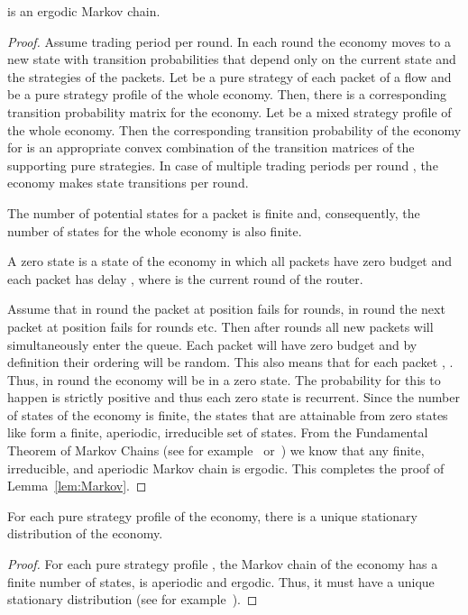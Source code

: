 \documentclass[letterpaper,10pt]{llncs}
\newcommand{\hla}[1]{\hl{#1}}
\renewcommand{\hla}[1]{#1}
\begin{document}
\begin{lemma}
\label{lem:Markov}
 is an ergodic Markov chain.
\end{lemma}
\begin{proof}
Assume  trading period per round.
In each round the economy moves to a new state with transition probabilities that depend only
on the current state and the strategies of the packets. Let  be a pure strategy of
each packet  of a flow and  be a pure strategy profile of the whole economy. 
Then, there is a corresponding transition probability matrix  for the economy.
Let  be a mixed strategy profile of the whole economy. Then the corresponding
transition probability  of the economy for  
is an appropriate convex combination of the transition matrices of the supporting pure strategies. 
In case of multiple trading periods per round , the economy makes  state transitions 
per round.

The number of potential states for a packet is finite and, consequently, the number of states 
for the whole economy is also finite. 
\begin{definition}
\hla{A zero state  is a state of the economy in which all packets have zero budget and each packet  has delay , where  is the current round of the router. }
\end{definition}
Assume that in round  the packet at position  fails for  rounds, in round  the next packet at position  fails for  rounds etc. 
Then after  rounds all new packets will simultaneously enter the queue. Each packet will have zero budget
and by definition their ordering will be random. This also means that for each packet ,  . Thus, in round  the economy will be in a zero state.
The probability for this to happen is strictly positive and thus each zero state  is recurrent. Since the number of states of the economy is finite, the states that are attainable from zero states like  form a finite, aperiodic, irreducible set of states. 
From the Fundamental Theorem of Markov Chains (see for example~\cite{Motwani:1995:RA} or~\cite{Mitzenmacher:2005:PCR}) we know that any finite, irreducible, and aperiodic Markov chain is ergodic. This completes the proof of Lemma~\ref{lem:Markov}.
\end{proof}

\begin{lemma}
\label{lem:sce1pi}
For each pure strategy profile  of the economy, there is a unique stationary distribution  of the economy.
\end{lemma}
\begin{proof}
For each pure strategy profile , the Markov chain of the economy has a finite number of states, is aperiodic and ergodic. Thus, it must have a unique stationary distribution 
(see for example~\cite[Theorem 7.7]{Mitzenmacher:2005:PCR}).
\end{proof}
\end{document}
